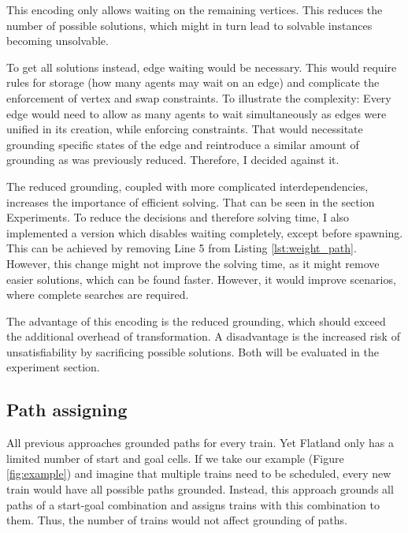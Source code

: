 \documentclass{llncs}
\begin{document}
\begin{multicols*}{2}
This encoding only allows waiting on the remaining vertices. This reduces the number of possible solutions, which might in turn lead to solvable instances becoming unsolvable.

To get all solutions instead, edge waiting would be necessary. This would require rules for storage (how many agents may wait on an edge) and complicate the enforcement of vertex and swap constraints. To illustrate the complexity: Every edge would need to allow as many agents to wait simultaneously as edges were unified in its creation, while enforcing constraints. That would necessitate grounding specific states of the edge and reintroduce a similar amount of grounding as was previously reduced. Therefore, I decided against it.

The reduced grounding, coupled with more complicated interdependencies, increases the importance of efficient solving. That can be seen in the section Experiments. To reduce the decisions and therefore solving time, I also implemented a version which disables waiting completely, except before spawning. This can be achieved by removing Line 5 from Listing \ref{lst:weight_path}. However, this change might not improve the solving time, as it might remove easier solutions, which can be found faster. However, it would improve scenarios, where complete searches are required.

The advantage of this encoding is the reduced grounding, which should exceed the additional overhead of transformation. A disadvantage is the increased risk of unsatisfiability by sacrificing possible solutions. Both will be evaluated in the experiment section.

\subsection*{Path assigning}
\begin{figure}[b]
    
\end{figure}

All previous approaches grounded paths for every train. Yet Flatland only has a limited number of start and goal cells. If we take our example (Figure \ref{fig:example}) and imagine that multiple trains need to be scheduled, every new train would have all possible paths grounded. Instead, this approach grounds all paths of a start-goal combination and assigns trains with this combination to them. Thus, the number of trains would not affect grounding of paths.\\


\end{multicols*}
\end{document}
